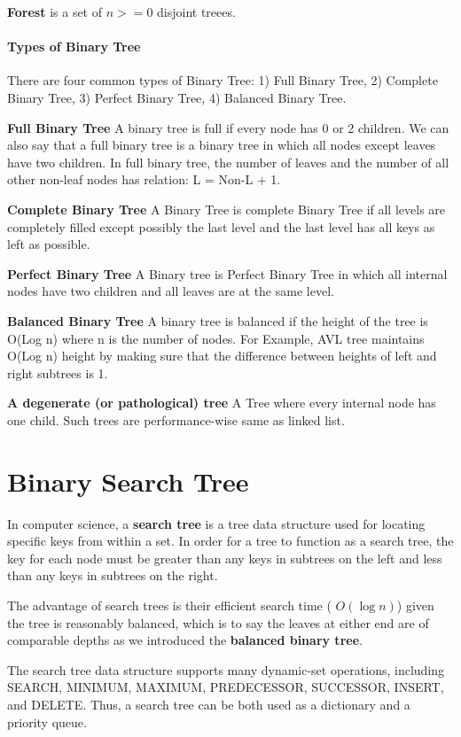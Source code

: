 \documentclass[data-structure.tex]{subfiles}
\begin{document}
\textbf{Forest} is a set of $n>=0$ disjoint treees. 


\paragraph{Types of Binary Tree}
There are four common types of Binary Tree: 1) Full Binary Tree, 2) Complete Binary Tree, 3) Perfect Binary Tree, 4) Balanced Binary Tree.

\textbf{Full Binary Tree} A binary tree is full if every node has 0 or 2 children. We can also say that a full binary tree is a binary tree in which all nodes except leaves have two children.  In full binary tree, the number of leaves and the number of all other non-leaf nodes has relation: L = Non-L + 1. 

\textbf{Complete Binary Tree} A Binary Tree is complete Binary Tree if all levels are completely filled except possibly the last level and the last level has all keys as left as possible.

\textbf{Perfect Binary Tree} A Binary tree is Perfect Binary Tree in which all internal nodes have two children and all leaves are at the same level.

\textbf{Balanced Binary Tree} A binary tree is balanced if the height of the tree is O(Log n) where n is the number of nodes. For Example, AVL tree maintains O(Log n) height by making sure that the difference between heights of left and right subtrees is 1.

\textbf{A degenerate (or pathological) tree} A Tree where every internal node has one child. Such trees are performance-wise same as linked list.
\section{Binary Search Tree}
\label{sec_binary_search_tree}
 In computer science, a \textbf{search tree} is a tree data structure used for locating specific keys from within a set. In order for a tree to function as a search tree, the key for each node must be greater than any keys in subtrees on the left and less than any keys in subtrees on the right. 

The advantage of search trees is their efficient search time ( $O(\log n)$) given the tree is reasonably balanced, which is to say the leaves at either end are of comparable depths as we introduced the \textbf{balanced binary tree}. 

The search tree data structure supports many dynamic-set operations, including SEARCH, MINIMUM, MAXIMUM, PREDECESSOR, SUCCESSOR, INSERT, and DELETE. Thus, a search tree can be both used as a dictionary and a priority queue.
\end{document}
